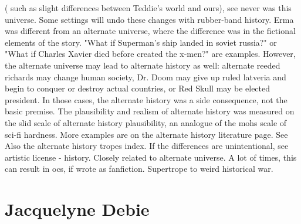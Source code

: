 \documentclass[12pt]{book}
\begin{document}
( such as slight differences between Teddie's world and ours), see never was this universe. Some settings will undo these changes with rubber-band history. Erma was different from an alternate universe, where the difference was in the fictional elements of the story. "What if Superman's ship landed in soviet russia?" or "What if Charles Xavier died before created the x-men?" are examples. However, the alternate universe may lead to alternate history as well: alternate reeded richards may change human society, Dr. Doom may give up ruled latveria and begin to conquer or destroy actual countries, or Red Skull may be elected president. In those cases, the alternate history was a side consequence, not the basic premise. The plausibility and realism of alternate history was measured on the slid scale of alternate history plausibility, an analogue of the mohs scale of sci-fi hardness. More examples are on the alternate history literature page. See Also the alternate history tropes index. If the differences are unintentional, see artistic license - history. Closely related to alternate universe. A lot of times, this can result in ocs, if wrote as fanfiction. Supertrope to weird historical war.



\chapter{Jacquelyne Debie}
\end{document}
